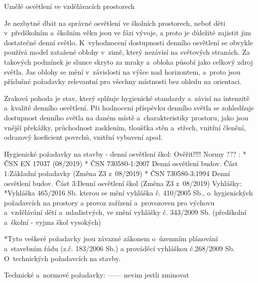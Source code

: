 \sec Umělé osvětlení ve vzdělávacích prostorech

Je nezbytné dbát na správné osvětlení ve školních prostorech, neboť děti v~předškolním a~školním věku jsou ve fázi vývoje,
a proto je důležité zajistit jim dostatečné denní světlo.
K~vyhodnocení dostupnosti denního osvětlení se obvykle používá model zatažené oblohy v~zimě, který nezávisí na světových stranách.
Za takových podmínek je slunce skryto za mraky a~obloha působí jako celkový zdroj světla.
Jas oblohy se mění v~závislosti na výšce nad horizontem, a~proto jsou příslušné požadavky relevantní pro všechny místnosti bez ohledu na orientaci.

Zraková pohoda je stav, který splňuje hygienické standardy a~závisí na intenzitě a~kvalitě denního osvětlení.
Při hodnocení příspěvku denního světla se zohledňuje dostupnost denního světla na daném místě a~charakteristiky
prostoru, jako jsou vnější překážky, průchodnost zasklením, tloušťka stěn a~střech, vnitřní členění, odrazový
koeficient povrchů, vnitřní vybavení apod.

\secc Hygienické požadavky na stavby - denní osvětlení škol:
Ověřit!!!! Normy ??? :
\begitems
* ČSN EN 17037 (08/2019)
* ČSN 730580-1:2007 Denní osvětlení budov. Část 1:Základní požadavky (Změna Z3 z~08/2019)
* ČSN 730580-3:1994 Denní osvětlení budov. Část 3:Denní osvětlení škol (Změna Z3 z~08/2019)
\medskip
{\sbf Vyhlášky:}
\medskip
*Vyhláška 465/2016 Sb. kterou se mění vyhláška č. 410/2005 Sb., o~hygienických požadavcích na prostory a
provoz zařízení a~provozoven pro výchovu a~vzdělávání dětí a~mladistvých, ve znění vyhlášky č. 343/2009 Sb.
(předškolní a~školní - vyjma škol vysokých)

*Tyto veškeré požadavky jsou závazné zákonem o~územním plánování a~stavebním řádu (z.č. 183/2006 Sb.) a
prováděcí vyhláškou č.268/2009 Sb. O~technických požadavcích na stavby.
\enditems

\secc Technické a~normové požadavky:   ------ nevim jestli zminovat


